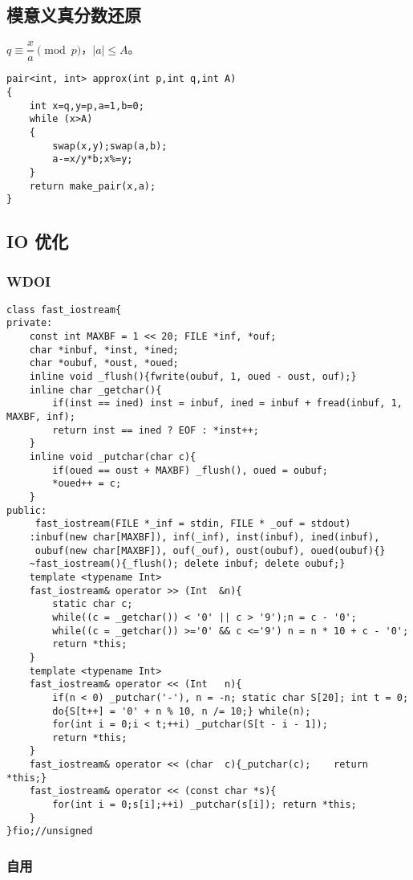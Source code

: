 \documentclass{ctexart}
\begin{document}
\subsection{模意义真分数还原}

$q\equiv \dfrac{x}{a}\pmod p$，$|a|\le A$。

\begin{lstlisting}
pair<int, int> approx(int p,int q,int A)
{
	int x=q,y=p,a=1,b=0;
	while (x>A)
	{
		swap(x,y);swap(a,b);
		a-=x/y*b;x%=y;
	}
	return make_pair(x,a);
}
\end{lstlisting}

\subsection{IO 优化}

\subsubsection{WDOI}

\begin{lstlisting}
class fast_iostream{
private:
	const int MAXBF = 1 << 20; FILE *inf, *ouf;
	char *inbuf, *inst, *ined;
	char *oubuf, *oust, *oued;
	inline void _flush(){fwrite(oubuf, 1, oued - oust, ouf);}
	inline char _getchar(){
		if(inst == ined) inst = inbuf, ined = inbuf + fread(inbuf, 1, MAXBF, inf);
		return inst == ined ? EOF : *inst++;
	}
	inline void _putchar(char c){
		if(oued == oust + MAXBF) _flush(), oued = oubuf;
		*oued++ = c;
	}
public:
	 fast_iostream(FILE *_inf = stdin, FILE * _ouf = stdout)
	:inbuf(new char[MAXBF]), inf(_inf), inst(inbuf), ined(inbuf),
	 oubuf(new char[MAXBF]), ouf(_ouf), oust(oubuf), oued(oubuf){}
	~fast_iostream(){_flush(); delete inbuf; delete oubuf;}
	template <typename Int>
	fast_iostream& operator >> (Int  &n){
		static char c;
		while((c = _getchar()) < '0' || c > '9');n = c - '0';
		while((c = _getchar()) >='0' && c <='9') n = n * 10 + c - '0';
		return *this;
	}
	template <typename Int>
	fast_iostream& operator << (Int   n){
		if(n < 0) _putchar('-'), n = -n; static char S[20]; int t = 0;
		do{S[t++] = '0' + n % 10, n /= 10;} while(n);
		for(int i = 0;i < t;++i) _putchar(S[t - i - 1]);
		return *this;
	}
	fast_iostream& operator << (char  c){_putchar(c);    return *this;}
	fast_iostream& operator << (const char *s){
		for(int i = 0;s[i];++i) _putchar(s[i]); return *this;
	}
}fio;//unsigned
\end{lstlisting}

\subsubsection{自用}
\end{document}
